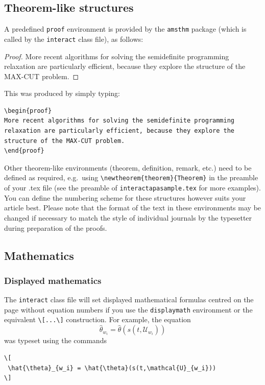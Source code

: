 \documentclass[]{interact}
\theoremstyle{plain}%
\theoremstyle{definition}
\theoremstyle{remark}
\begin{document}
\subsection{Theorem-like structures}

A predefined \verb"proof" environment is provided by the \texttt{amsthm} package (which is called by the \texttt{interact} class file), as follows:
\begin{proof}
More recent algorithms for solving the semidefinite programming relaxation are particularly efficient, because they explore the structure of the MAX-CUT problem.
\end{proof}
\noindent This was produced by simply typing:
\begin{verbatim}
\begin{proof}
More recent algorithms for solving the semidefinite programming
relaxation are particularly efficient, because they explore the
structure of the MAX-CUT problem.
\end{proof}
\end{verbatim}
Other theorem-like environments (theorem, definition, remark, etc.) need to be defined as required, e.g.\ using \verb"\newtheorem{theorem}{Theorem}" in the preamble of your .tex file (see the preamble of \verb"interactapasample.tex" for more examples). You can define the numbering scheme for these structures however suits your article best. Please note that the format of the text in these environments may be changed if necessary to match the style of individual journals by the typesetter during preparation of the proofs.


\subsection{Mathematics}

\subsubsection{Displayed mathematics}

The \texttt{interact} class file will set displayed mathematical formulas centred on the page without equation numbers if you use the \texttt{displaymath} environment or the equivalent \verb"\[...\]" construction. For example, the equation
\[
 \hat{\theta}_{w_i} = \hat{\theta}(s(t,\mathcal{U}_{w_i}))
\]
was typeset using the commands
\begin{verbatim}
\[
 \hat{\theta}_{w_i} = \hat{\theta}(s(t,\mathcal{U}_{w_i}))
\]
\end{verbatim}
\end{document}

